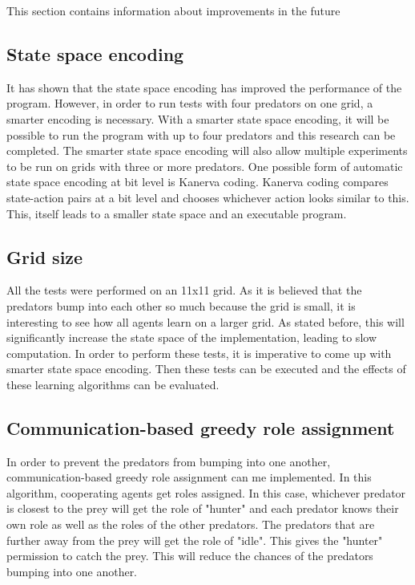 This section contains information about improvements in the future

\subsection{State space encoding}
It has shown that the state space encoding has improved the performance of the program. However, in order to run tests with four predators on one grid, a smarter encoding is necessary. With a smarter state space encoding, it will be possible to run the program with up to four predators and this research can be completed. The smarter state space encoding will also allow multiple experiments to be run on grids with three or more predators. One possible form of automatic state space encoding at bit level is Kanerva coding\cite{wu2009function}. Kanerva coding compares state-action pairs at a bit level and chooses whichever action looks similar to this. This, itself leads to a smaller state space and an executable program.

\subsection{Grid size}
All the tests were performed on an 11x11 grid. As it is believed that the predators bump into each other so much because the grid is small, it is interesting to see how all agents learn on a larger grid. As stated before, this will significantly increase the state space of the implementation, leading to slow computation. In order to perform these tests, it is imperative to come up with smarter state space encoding. Then these tests can be executed and the effects of these learning algorithms can be evaluated.

\subsection{Communication-based greedy role assignment}
In order to prevent the predators from bumping into one another, communication-based greedy role assignment can me implemented. In this algorithm, cooperating agents get roles assigned. In this case, whichever predator is closest to the prey will get the role of "hunter" and each predator knows their own role as well as the roles of the other predators. The predators that are further away from the prey will get the role of "idle". This gives the "hunter" permission to catch the prey. This will reduce the chances of the predators bumping into one another.

